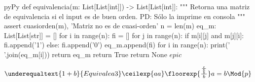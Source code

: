 
\begin{sourcecode}{py}{Py}
def equivalencia(m: List[List[int]]) -> List[List[int]]:
"""
Retorna una matriz de equivalencia si el input es de buen orden.
PD: Sólo la imprime en consola
"""
	assert cuasiorden(m), 'Matriz no es de cuasi-orden'
	n = len(m)
	eq_m: List[List[str]] = []
	for i in range(n):
		fi = []
		for j in range(n):
			if m[i][j] and m[j][i]:
				fi.append('1')
			else:
				fi.append('0')
			eq_m.append(fi)
			for i in range(n):
				print(' '.join(eq_m[i]))
	return eq_m
	return True
	return None $epic$
\end{sourcecode}

$\underequaltext{1+b}{Equivale a 3} \ceilexp{aa} \floorexp{\frac{\frac{e}{\frac{e}{b}}}{b}} a=b\Mod{p}$